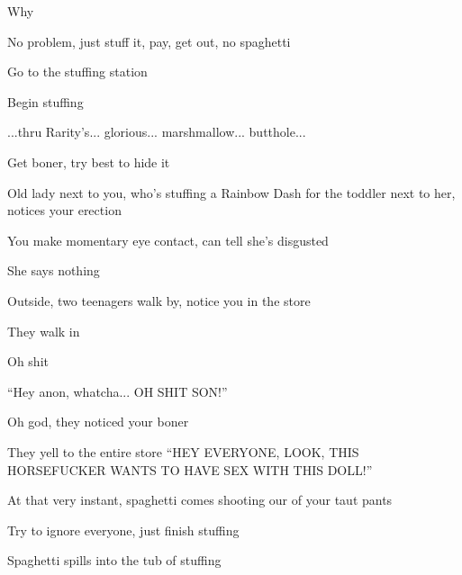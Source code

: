 \documentclass[a1paper]{article}
\begin{document}
\begin{multicols}{7}
{\textrangle \hspace{0.1em} Why

\textrangle \hspace{0.1em} No problem, just stuff it, pay, get out, no spaghetti

\textrangle \hspace{0.1em} Go to the stuffing station

\textrangle \hspace{0.1em} Begin stuffing

\textrangle \hspace{0.1em} ...thru Rarity's... glorious... marshmallow... butthole...

\textrangle \hspace{0.1em} Get boner, try best to hide it

\textrangle \hspace{0.1em} Old lady next to you, who's stuffing a Rainbow Dash for the toddler next to her, notices your erection

\textrangle \hspace{0.1em} You make momentary eye contact, can tell she's disgusted

\textrangle \hspace{0.1em} She says nothing

\textrangle \hspace{0.1em} Outside, two teenagers walk by, notice you in the store

\textrangle \hspace{0.1em} They walk in

\textrangle \hspace{0.1em} Oh shit

\textrangle \hspace{0.1em} ``Hey anon, whatcha... OH SHIT SON!''

\textrangle \hspace{0.1em} Oh god, they noticed your boner

\textrangle \hspace{0.1em} They yell to the entire store ``HEY EVERYONE, LOOK, THIS HORSEFUCKER WANTS TO HAVE SEX WITH THIS DOLL!''

\textrangle \hspace{0.1em} At that very instant, spaghetti comes shooting our of your taut pants

\textrangle \hspace{0.1em} Try to ignore everyone, just finish stuffing

\textrangle \hspace{0.1em} Spaghetti spills into the tub of stuffing

}
\end{multicols}
\end{document}
